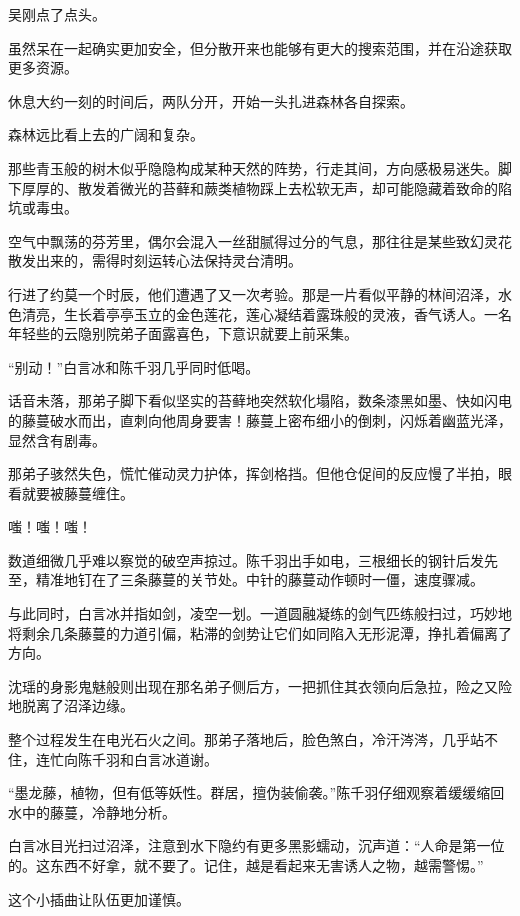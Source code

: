吴刚点了点头。

虽然呆在一起确实更加安全，但分散开来也能够有更大的搜索范围，并在沿途获取更多资源。

休息大约一刻的时间后，两队分开，开始一头扎进森林各自探索。

\vspace{2em}

森林远比看上去的广阔和复杂。

那些青玉般的树木似乎隐隐构成某种天然的阵势，行走其间，方向感极易迷失。脚下厚厚的、散发着微光的苔藓和蕨类植物踩上去松软无声，却可能隐藏着致命的陷坑或毒虫。

空气中飘荡的芬芳里，偶尔会混入一丝甜腻得过分的气息，那往往是某些致幻灵花散发出来的，需得时刻运转心法保持灵台清明。

行进了约莫一个时辰，他们遭遇了又一次考验。那是一片看似平静的林间沼泽，水色清亮，生长着亭亭玉立的金色莲花，莲心凝结着露珠般的灵液，香气诱人。一名年轻些的云隐别院弟子面露喜色，下意识就要上前采集。

“别动！”白言冰和陈千羽几乎同时低喝。

话音未落，那弟子脚下看似坚实的苔藓地突然软化塌陷，数条漆黑如墨、快如闪电的藤蔓破水而出，直刺向他周身要害！藤蔓上密布细小的倒刺，闪烁着幽蓝光泽，显然含有剧毒。

那弟子骇然失色，慌忙催动灵力护体，挥剑格挡。但他仓促间的反应慢了半拍，眼看就要被藤蔓缠住。

嗤！嗤！嗤！

数道细微几乎难以察觉的破空声掠过。陈千羽出手如电，三根细长的钢针后发先至，精准地钉在了三条藤蔓的关节处。中针的藤蔓动作顿时一僵，速度骤减。

与此同时，白言冰并指如剑，凌空一划。一道圆融凝练的剑气匹练般扫过，巧妙地将剩余几条藤蔓的力道引偏，粘滞的剑势让它们如同陷入无形泥潭，挣扎着偏离了方向。

沈瑶的身影鬼魅般则出现在那名弟子侧后方，一把抓住其衣领向后急拉，险之又险地脱离了沼泽边缘。

整个过程发生在电光石火之间。那弟子落地后，脸色煞白，冷汗涔涔，几乎站不住，连忙向陈千羽和白言冰道谢。

“墨龙藤，植物，但有低等妖性。群居，擅伪装偷袭。”陈千羽仔细观察着缓缓缩回水中的藤蔓，冷静地分析。

白言冰目光扫过沼泽，注意到水下隐约有更多黑影蠕动，沉声道：“人命是第一位的。这东西不好拿，就不要了。记住，越是看起来无害诱人之物，越需警惕。”

这个小插曲让队伍更加谨慎。

\vspace{2em}

